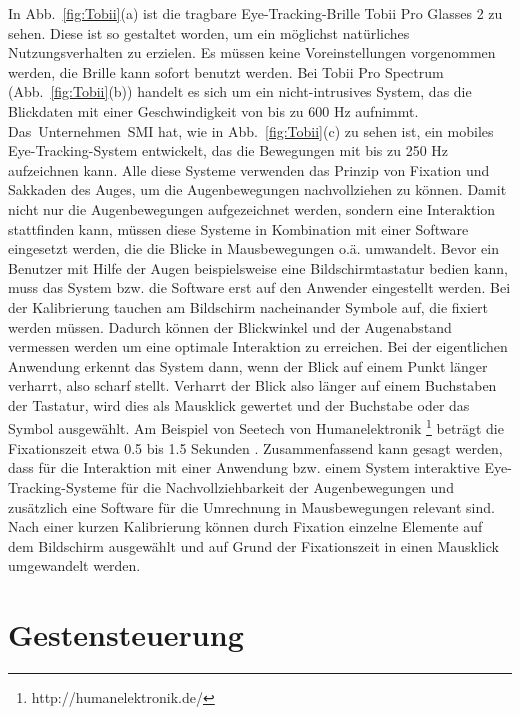In Abb.~\ref{fig:Tobii}(a) ist die tragbare Eye-Tracking-Brille Tobii Pro Glasses 2 zu sehen. Diese ist so gestaltet worden, um ein möglichst natürliches Nutzungsverhalten zu erzielen. Es müssen keine Voreinstellungen vorgenommen werden, die Brille kann sofort benutzt werden. Bei Tobii Pro Spectrum (Abb.~\ref{fig:Tobii}(b)) handelt es sich um ein nicht-intrusives System, das die Blickdaten mit einer Geschwindigkeit von bis zu 600 Hz aufnimmt. \mbox{Das Unternehmen SMI} hat, wie in Abb.~\ref{fig:Tobii}(c) zu sehen ist, ein mobiles Eye-Tracking-System entwickelt, das die Bewegungen mit bis zu 250 Hz aufzeichnen kann. Alle diese Systeme verwenden das Prinzip von Fixation und Sakkaden des Auges, um die Augenbewegungen nachvollziehen zu können. Damit nicht nur die Augenbewegungen aufgezeichnet werden, sondern eine Interaktion stattfinden kann, müssen diese Systeme in Kombination mit einer Software eingesetzt werden, die die Blicke in Mausbewegungen o.ä. umwandelt.
\newline \newline
Bevor ein Benutzer mit Hilfe der Augen beispielsweise eine Bildschirmtastatur bedien kann, muss das System bzw. die Software erst auf den Anwender eingestellt werden. Bei der Kalibrierung tauchen am Bildschirm nacheinander Symbole auf, die fixiert werden müssen. Dadurch können der Blickwinkel und der Augenabstand vermessen werden um eine optimale Interaktion zu erreichen. Bei der eigentlichen Anwendung erkennt das System dann, wenn der Blick auf einem Punkt länger verharrt, also scharf stellt. Verharrt der Blick also länger auf einem Buchstaben der Tastatur, wird dies als Mausklick gewertet und der Buchstabe oder das Symbol ausgewählt. Am Beispiel von Seetech von Humanelektronik%
\footnote{http://humanelektronik.de/}
%
beträgt die Fixationszeit etwa 0.5 bis 1.5 Sekunden \cite{SEETECH}.
\newline \newline
Zusammenfassend kann gesagt werden, dass für die Interaktion mit einer Anwendung bzw. einem System interaktive Eye-Tracking-Systeme für die Nachvollziehbarkeit der Augenbewegungen und zusätzlich eine Software für die Umrechnung in Mausbewegungen relevant sind. Nach einer kurzen Kalibrierung können durch Fixation einzelne Elemente auf dem Bildschirm ausgewählt und auf Grund der Fixationszeit in einen Mausklick umgewandelt werden.

\section{Gestensteuerung}

